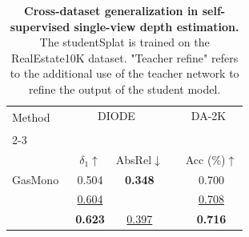 \begin{table}[ht!]
    \begin{center}
\footnotesize
    \setlength{\tabcolsep}{2.0pt} %
    \begin{tabular}{@{}lccc c@{}}
    \toprule
    \multirow{2}{*}[-2pt]{Method} & \multicolumn{2}{c}{DIODE~\scriptsize{\cite{vasiljevic2019diode}}}& & DA-2K~\scriptsize{\cite{yang2024depth}} \\
    \addlinespace[-12pt] \\
    \cmidrule{2-3} \cmidrule{5-5} 
    \addlinespace[-12pt] \\
    & $\delta_1$$\uparrow$ & AbsRel$\downarrow$ & & Acc (\%)$\uparrow$ \\
    \midrule
    
    GasMono~\scriptsize{\cite{zhao2023gasmono}}  & {0.504} & \textbf{0.348} && {0.700} \\
    \cellcolor{Gray}{studentSplat} & \cellcolor{Gray}\underline{0.604} & \cellcolor{Gray}{0.407} &\cellcolor{Gray}& \cellcolor{Gray}\underline{0.708} \\
    \cellcolor{Gray}{studentSplat w/ teacher refine} & \cellcolor{Gray}\textbf{0.623} & \cellcolor{Gray}\underline{0.397} &\cellcolor{Gray}& \cellcolor{Gray}\textbf{0.716} \\
    \bottomrule
    \end{tabular}
    \end{center}
    \caption{\textbf{Cross-dataset generalization in self-supervised single-view depth estimation.} The studentSplat is trained on the RealEstate10K dataset. "Teacher refine" refers to the additional use of the teacher network to refine the output of the student model.
    }
    \label{tab:mono_depth_teacher_refine}
    \vspace{-0.4cm}
\end{table}